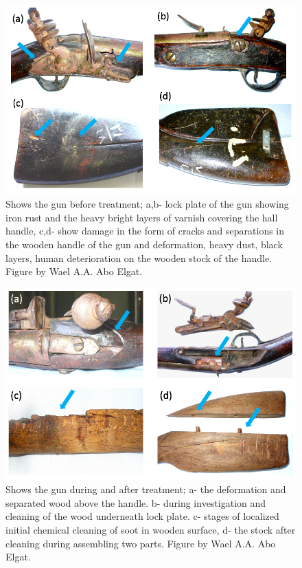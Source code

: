 \begin{figure}[!htb]
	\includegraphics[width=\linewidth]{figures/zidan_Fig1}
	\caption{Shows the gun before treatment; a,b- lock plate of the gun showing iron rust and the heavy bright layers of varnish covering the hall handle, c,d- show damage in the form of cracks and separations in the wooden handle of the gun and deformation, heavy dust, black layers, human deterioration on the wooden stock of the handle. Figure by Wael A.A. Abo Elgat.}
	\label{fig:Fig1}
\end{figure}
\begin{figure}[!htb]
	\includegraphics[width=\linewidth]{figures/zidan_Fig2}
	\caption{Shows the gun during and after treatment; a- the deformation and separated wood above the handle. b- during investigation and cleaning of the wood underneath lock plate. c- stages of localized initial chemical cleaning of soot in wooden surface, d- the stock after cleaning during assembling two parts. Figure by Wael A.A. Abo Elgat.}
	\label{fig:Fig2}
\end{figure}
